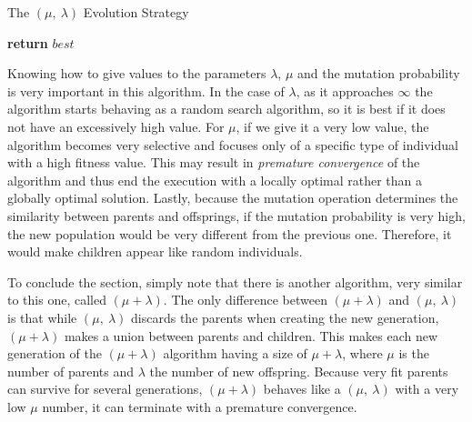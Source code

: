 \begin{algorithm}[H]
    \caption{The $(\mu,\ \lambda)$ Evolution Strategy}
    \begin{algorithmic}[1]
            \EndFor
                    \EndIf
                \EndFor
                    \EndFor
                \EndFor
            \EndWhile
            \State \textbf{return} $best$
        \EndProcedure
    \end{algorithmic}
\end{algorithm}

Knowing how to give values to the parameters $\lambda$, $\mu$ and the mutation probability is very important in this algorithm. In the case of $\lambda$, as it approaches $\infty$ the algorithm starts behaving as a random search algorithm, so it is best if it does not have an excessively high value. For $\mu$, if we give it a very low value, the algorithm becomes very selective and focuses only of a specific type of individual with a high fitness value. This may result in \textit{premature convergence} of the algorithm and thus end the execution with a locally optimal rather than a globally optimal solution. Lastly, because the mutation operation determines the similarity between parents and offsprings, if the mutation probability is very high, the new population would be very different from the previous one. Therefore, it would make children appear like random individuals.

To conclude the section, simply note that there is another algorithm, very similar to this one, called $(\mu + \lambda)$. The only difference between $(\mu + \lambda)$ and $(\mu,\ \lambda)$ is that while $(\mu,\ \lambda)$ discards the parents when creating the new generation, $(\mu + \lambda)$ makes a union between parents and children. This makes each new generation of the $(\mu + \lambda)$ algorithm having a size of $\mu + \lambda$, where $\mu$ is the number of parents and $\lambda$ the number of new offspring. Because very fit parents can survive for several generations, $(\mu + \lambda)$ behaves like a $(\mu,\ \lambda)$ with a very low $\mu$ number, it can terminate with a premature convergence.


